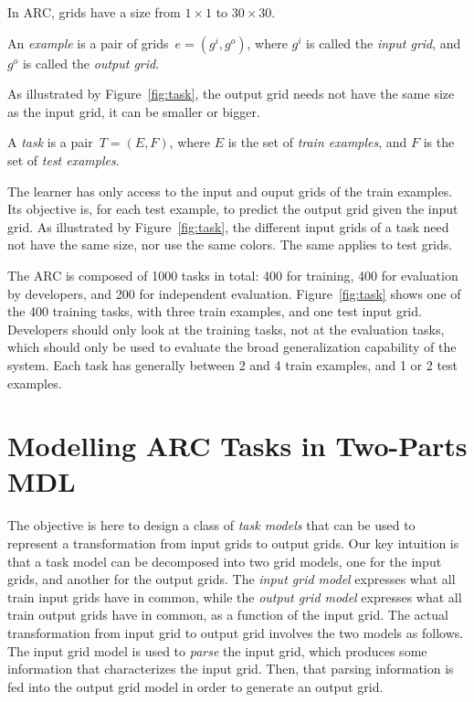\documentclass[a4paper]{llncs}
\begin{document}
In ARC, grids have a size from $1 \times 1$ to $30 \times 30$.

\begin{definition}[example] 
  An {\em example} is a pair of grids~$e = (g^i,g^o)$, where $g^i$ is called
  the {\em input grid}, and $g^o$ is called the {\em output grid}.
\end{definition}

As illustrated by Figure~\ref{fig:task}, the output grid needs not
have the same size as the input grid, it can be smaller or bigger.

\begin{definition}[task]
  A {\em task} is a pair~$T = (E,F)$, where $E$ is the set of {\em
    train examples}, and $F$ is the set of {\em test examples}.
\end{definition}

The learner has only access to the input and ouput grids of the
train examples. Its objective is, for each test example, to predict
the output grid given the input grid.
%
As illustrated by Figure~\ref{fig:task}, the different input grids of
a task need not have the same size, nor use the same colors. The same
applies to test grids.

The ARC is composed of 1000 tasks in total: 400 for training, 400 for
evaluation by developers, and 200 for independent
evaluation. Figure~\ref{fig:task} shows one of the 400 training tasks,
with three train examples, and one test input grid. Developers should
only look at the training tasks, not at the evaluation tasks, which
should only be used to evaluate the broad generalization capability of
the system.
%
Each task has generally between 2 and 4 train examples, and 1 or 2
test examples.

\section{Modelling ARC Tasks in Two-Parts MDL}
\label{modelling}

The objective is here to design a class of {\em task models} that can
be used to represent a transformation from input grids to output
grids.
%
Our key intuition is that a task model can be decomposed into two grid
models, one for the input grids, and another for the output grids. The
{\em input grid model} expresses what all train input grids have in
common, while the {\em output grid model} expresses what all train
output grids have in common, as a function of the input grid.
%
The actual transformation from input grid to output grid involves the
two models as follows. The input grid model is used to {\em parse} the
input grid, which produces some information that characterizes the
input grid. Then, that parsing information is fed into the output grid
model in order to generate an output grid.
\end{document}
